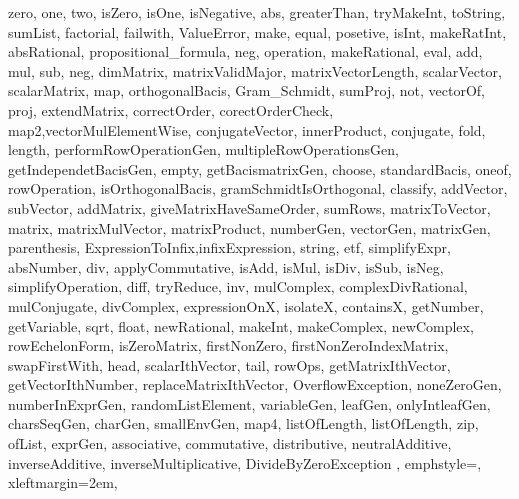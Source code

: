 {{    zero, one, two, isZero, isOne, isNegative, abs, greaterThan, tryMakeInt, toString, sumList, factorial, failwith, ValueError, make, equal, posetive, isInt, makeRatInt, absRational, propositional_formula, neg, operation, makeRational, eval, add, mul, sub, neg, dimMatrix, matrixValidMajor, matrixVectorLength, scalarVector, scalarMatrix, map, orthogonalBacis, Gram_Schmidt, sumProj, not, vectorOf, proj, extendMatrix, correctOrder, corectOrderCheck, map2,vectorMulElementWise, conjugateVector, innerProduct, conjugate, fold, length, performRowOperationGen, multipleRowOperationsGen, getIndependetBacisGen, empty, getBacismatrixGen, choose, standardBacis, oneof, rowOperation, isOrthogonalBacis, gramSchmidtIsOrthogonal, classify, addVector, subVector, addMatrix, giveMatrixHaveSameOrder, sumRows, matrixToVector, matrix, matrixMulVector, matrixProduct, numberGen, vectorGen, matrixGen, parenthesis, ExpressionToInfix,infixExpression, string, etf, simplifyExpr, absNumber, div, applyCommutative, isAdd, isMul, isDiv, isSub, isNeg, simplifyOperation, diff, tryReduce, inv, mulComplex, complexDivRational, mulConjugate, divComplex, expressionOnX, isolateX, containsX, getNumber, getVariable, sqrt, float, newRational, makeInt, makeComplex, newComplex, rowEchelonForm, isZeroMatrix, firstNonZero, firstNonZeroIndexMatrix, swapFirstWith, head, scalarIthVector, tail, rowOps, getMatrixIthVector, getVectorIthNumber, replaceMatrixIthVector, OverflowException, noneZeroGen, numberInExprGen, randomListElement, variableGen, leafGen, onlyIntleafGen, charsSeqGen, charGen, smallEnvGen, map4, listOfLength, listOfLength, zip, ofList, exprGen, associative, commutative, distributive, neutralAdditive, inverseAdditive, inverseMultiplicative, DivideByZeroException      
    }, %
  emphstyle=\color{red},
  xleftmargin=2em,
}





\lstset{style=fsharpstyle}

